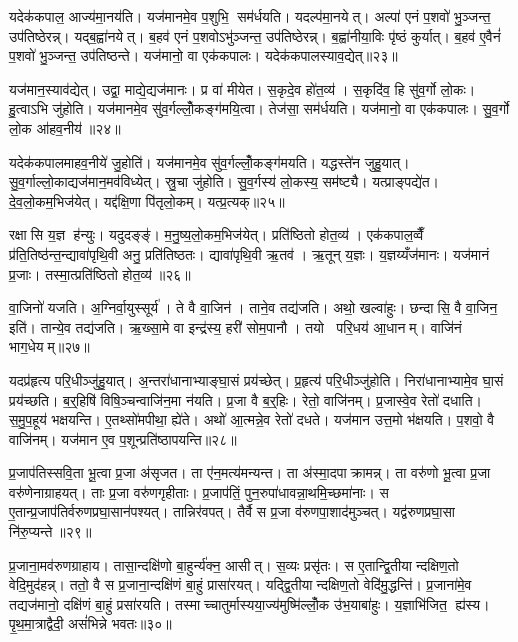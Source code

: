 यदेक॑कपाल॒ आज्य॑मा॒नय॑ति। यज॑मानमे॒व प॒शुभि॒ सम॑र्धयति। यदल्प॑मा॒नयेत्। अल्पा॑ एनं प॒शवो॑ भु॒ञ्जन्त॒ उप॑तिष्ठेरन्न्। यद्ब॒ह्वा॑नयेत्। ब॒हव॑ एनं प॒शवोऽभु॑ञ्जन्त॒ उप॑तिष्ठेरन्न्। ब॒ह्वा॑नीया॒विः पृ॑ष्ठं कुर्यात्। ब॒हव॑ ए॒वैनं॑ प॒शवो॑ भु॒ञ्जन्त॒ उप॑तिष्ठन्ते। यज॑मानो॒ वा एक॑कपालः। यदेक॑कपालस्याव॒द्येत्॥२३॥

यज॑मान॒स्याव॑द्येत्। उद्वा॒ माद्ये॒द्यज॑मानः। प्र वा॑ मीयेत। स॒कृदे॒व हो॑त॒व्य॑। स॒कृदि॑व॒ हि सु॑व॒र्गो लो॒कः। हु॒त्वाऽभि जु॑होति। यज॑मानमे॒व सु॑व॒र्गल्लोँ॒कङ्ग॑मयि॒त्वा। तेज॑सा॒ सम॑र्धयति। यज॑मानो॒ वा एक॑कपालः। सु॒व॒र्गो लो॒क आ॑हव॒नीय॑॥२४॥

यदेक॑कपालमाहव॒नीये॑ जु॒होति॑। यज॑मानमे॒व सु॑व॒र्गल्लोँ॒कङ्ग॑मयति। यद्धस्ते॑न जुहु॒यात्। सु॒व॒र्गाल्लो॒काद्यज॑मान॒मव॑विध्येत्। स्रु॒चा जु॑होति। सु॒व॒र्गस्य॑ लो॒कस्य॒ सम॑ष्ट्यै। यत्प्राङ्पद्ये॑त। दे॒व॒लो॒कम॒भिज॑येत्। यद्द॑क्षि॒णा पि॑तृलो॒कम्। यत्प्र॒त्यक्॥२५॥

रक्षासि य॒ज्ञ ह॑न्युः। यदुदङ्ङ्॑। म॒नु॒ष्य॒लो॒कम॒भिज॑येत्। प्रति॑ष्ठितो होत॒व्य॑। एक॑कपाल॒व्वैँ प्र॑ति॒तिष्ठ॑न्त॒न्द्यावा॑पृथि॒वी अनु॒ प्रति॑तिष्ठतः। द्यावा॑पृथि॒वी ऋ॒तव॑। ऋ॒तून् य॒ज्ञः। य॒ज्ञय्यँज॑मानः। यज॑मानं प्र॒जाः। तस्मा॒त्प्रति॑ष्ठितो होत॒व्य॑॥२६॥

वा॒जिनो॑ यजति। अ॒ग्निर्वा॒युस्सूर्य॑। ते वै वा॒जिन॑। ताने॒व तद्य॑जति। अथो॒ खल्वा॑हुः। छन्दासि॒ वै वा॒जिन॒ इति॑। तान्ये॒व तद्य॑जति। ऋ॒ख्सा॒मे वा इन्द्र॑स्य॒ हरी॑ सोम॒पानौ। तयो परि॒धय॑ आ॒धानम्। वाजि॑नं भाग॒धेयम्॥२७॥

यदप्र॑हृत्य परि॒धीञ्जु॑हु॒यात्। अ॒न्तरा॑धानाभ्याङ्घा॒सं प्रय॑च्छेत्। प्र॒हृत्य॑ परि॒धीञ्जु॑होति। निरा॑धानाभ्यामे॒व घा॒सं प्रय॑च्छति। ब॒र्॒हिषि॑ विषि॒ञ्चन्वाजि॑न॒मा न॑यति। प्र॒जा वै ब॒र्॒हिः। रेतो॒ वाजि॑नम्। प्र॒जास्वे॒व रेतो॑ दधाति। स॒मु॒प॒हूय॑ भक्षयन्ति। ए॒तथ्सो॑मपीथा॒ ह्ये॑ते। अथो॑ आ॒त्मन्ने॒व रेतो॑ दधते। यज॑मान उत्त॒मो भ॑क्षयति। प॒शवो॒ वै वाजि॑नम्। यज॑मान ए॒व प॒शून्प्रति॑ष्ठापयन्ति॥२८॥\anuvakamend[लो॒को ब॑हुरू॒पं भ॑व॒त्याज्य॑भागौ प॒शव॒ आज्य॑मव॒द्येदा॑हव॒नीय॑ प्र॒त्यक्तस्मा॒त्प्रति॑ष्ठितो होत॒व्यो॑ भाग॒धेय॑मे॒ते च॒त्वारि॑ च]

प्र॒जाप॑तिस्सवि॒ता भू॒त्वा प्र॒जा अ॑सृजत। ता ए॑न॒मत्य॑मन्यन्त। ता अ॑स्मा॒दपाक्रामन्न्। ता वरु॑णो भू॒त्वा प्र॒जा वरु॑णेनाग्राहयत्। ताः प्र॒जा वरु॑णगृहीताः। प्र॒जाप॑तिं॒ पुन॒रुपा॑धावन्ना॒थमि॒च्छमा॑नाः। स ए॒तान्प्र॒जाप॑तिर्वरुणप्रघा॒सान॑पश्यत्। तान्निर॑वपत्। तैर्वै स प्र॒जा व॑रुणपा॒शाद॑मुञ्चत्। यद्व॑रुणप्रघा॒सा नि॑रु॒प्यन्ते॥२९॥

प्र॒जाना॒मव॑रुणग्राहाय। तासा॒न्दक्षि॑णो बा॒हुर्न्य॑क्न॒ आसीत्। स॒व्यः प्रसृ॑तः। स ए॒तान्द्वि॒तीयान्दक्षिण॒तो वेदि॒मुद॑हन्न्। ततो॒ वै स प्र॒जाना॒न्दक्षि॑णं बा॒हुं प्रासा॑रयत्। यद्द्वि॒तीयान्दक्षिण॒तो वेदि॑मु॒द्धन्ति॑। प्र॒जाना॑मे॒व तद्यज॑मानो॒ दक्षि॑णं बा॒हुं प्रसा॑रयति। तस्माच्चातुर्मास्यया॒ज्य॑मुष्मि॑ल्लोँ॒क उ॑भ॒याबा॑हुः। य॒ज्ञाभि॑जित॒ ह्य॑स्य। पृ॒थ॒मा॒त्राद्वैदी॒ असं॑भिन्ने भवतः॥३०॥

